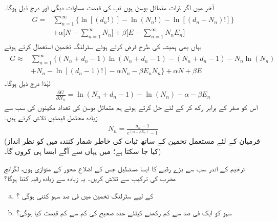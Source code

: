 آخر میں اگر ذرات متماثل بوسن ہوں تب  کی قیمت مساوات  دیگی اور درج ذیل ہوگا۔
\begin{gather}
\begin{aligned}
G =& \sum_{n = 1}^{\infty} \{ \ln[(d_n !) ] - \ln(N_n !) - \ln[(d_n - N_n) ! ] \} \\
&+ \alpha \big [ N - \sum_{n = 1}^{\infty} N_n \big ] + \beta \big [ E - \sum_{n = 1}^{\infty} N_n E_n \big ]
\end{aligned}
\end{gather}
یہاں بھی ہمیشہ کی طرح  فرض کرتے ہوئے سٹرلنگ تخمین استعمال کرتے ہوئے 
\begin{gather}
\begin{aligned}
G \approx &\sum_{n = 1}^{\infty} \{ (N_n + d_n - 1) \ln(N_n + d_n - 1) - (N_n + d_n - 1) - N_n \ln(N_n) \\
&+ N_n - \ln[(d_n - 1) !] - \alpha N_n - \beta E_n N_n \} + \alpha N + \beta E
\end{aligned}
\end{gather}
لہٰذا درج ذیل ہوگا۔
\begin{align}
\frac{\partial G}{\partial N_n} = \ln(N_n + d_n - 1) - \ln(N_n) - \alpha - \beta E_n
\end{align}
اس کو صفر کے برابر رکھ کر  کے لئے حل کرتے ہوئے ہم متماثل بوسن کی تعداد مکینوں کی سب سے زیادہ محتمل قیمتیں تلاش کرتے ہیں۔ 
\begin{align}\label{مساوات_متماثل_سب_سے_زیادہ_محتمل_برائے_بوسن}
N_n = \frac{d_n - 1}{e^{(\alpha + \beta E_n)} - 1}
\end{align}
(فرمیان کے لئے مستعمل تخمین کے ساتھ ثبات کی خاطر شمار کنندہ میں  کو نظر انداز کیا جا سکتا ہے؛ میں یہاں سے آگے ایسا ہی کروں گا۔)

ترخیم  کے اندر سب سے بڑے رقبے کا ایسا مستطیل جس کے اضلاع محور کے متوازی ہوں، لگرانج مضرب کی ترکیب سے تلاش کریں۔ یہ زیادہ سے زیادہ رقبہ کتنا ہوگا؟ 
\begin{enumerate}[a.]
\item
{} کے لیے سٹرلنگ تخمین میں فی صد سہو کتنی ہوگی ؟
\item
سہو کو ایک فی صد سے کم رکھنے کیلئے عدد صحیح  کی کم سے کم قیمت کیا ہوگی؟ 
\end{enumerate}



